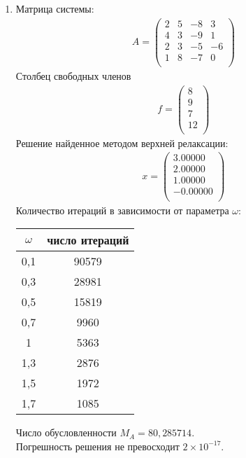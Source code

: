 \documentclass[a4paper,12pt,titlepage,finall]{article}
\begin{document}
\begin{enumerate}
\item
Матрица системы:
\begin{align*}
A = \begin{pmatrix}
2&           5&          -8&           3 \\
         4&           3&          -9&           1 \\
         2&           3&          -5&          -6 \\
         1&           8&          -7&           0 \\
\end{pmatrix}
\end{align*}
Столбец свободных членов
\begin{align*}
f = \begin{pmatrix}
8 \\
         9 \\
         7 \\
        12 \\
\end{pmatrix}
\end{align*}
Решение найденное методом верхней релаксации:
\begin{align*}
x = \begin{pmatrix}
3.00000 \\
   2.00000 \\
   1.00000 \\
  -0.00000 \\
\end{pmatrix}
\end{align*}
Количество итераций в зависимости от параметра $\omega$:
\begin{center}
\begin{tabular}{|c|c|}
\hline
$\omega$ & число итераций\\
\hline
0,1 & 90579\\
0,3 & 28981\\
0,5 & 15819\\
0,7 & 9960\\
 1 & 5363\\
 1,3 & 2876\\
 1,5 & 1972\\
 1,7 & 1085\\
 \hline
\end{tabular}
\end{center}

Число обусловленности $M_A = 80,285714$.\\
Погрешность решения не превосходит $2 \times 10^{-17}$.


\end{enumerate}
\end{document}
